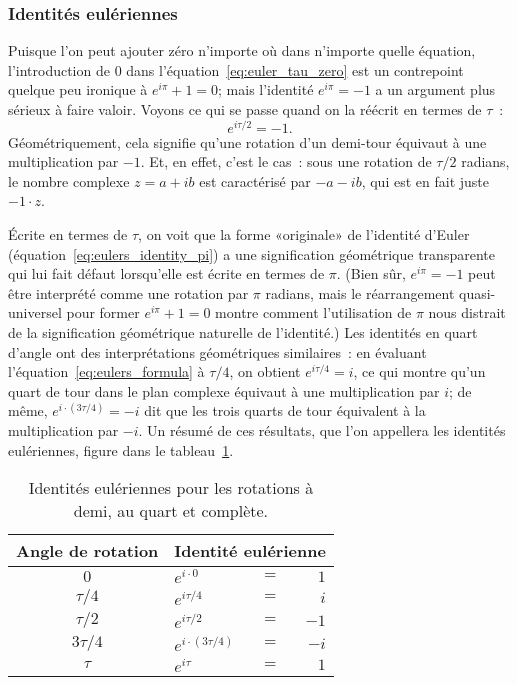       \subsubsection{Identités eulériennes} %
      \label{sec:eulerian_identities}

Puisque l'on peut ajouter zéro n'importe où dans n'importe quelle équation,
l'introduction de $0$ dans l'équation~\eqref{eq:euler_tau_zero} est un
contrepoint quelque peu ironique à $e^{i\pi} + 1 = 0$\ns; mais l'identité
$e^{i\pi} = -1$ a un argument plus sérieux à faire valoir. Voyons ce qui
se passe quand on la réécrit en termes de $\tau$~:
\[
e^{i\tau /2} = -1.
\]
Géométriquement, cela signifie qu'une rotation d'un demi-tour équivaut à une
multiplication par $-1$. Et, en effet, c'est le cas~: sous une rotation de
$\tau/2$ radians, le nombre complexe $z = a + ib$ est caractérisé par $-a - ib$, qui
est en fait juste $-1\cdot z$.

Écrite en termes de $\tau$, on voit que la forme «\ns originale\ns » de l'identité
d'Euler (équation~\eqref{eq:eulers_identity_pi}) a une signification
géométrique transparente qui lui fait défaut lorsqu'elle est écrite en termes de
$\pi$. (Bien sûr, $e^{i\pi} = -1$ peut être interprété comme une rotation par
$\pi$ radians, mais le réarrangement quasi-universel pour former $e^{i\pi} + 1 =
0$ montre comment l'utilisation de $\pi$ nous distrait de la signification
géométrique naturelle de l'identité.) Les identités en quart d'angle ont des
interprétations géométriques similaires~: en évaluant
l'équation~\eqref{eq:eulers_formula} à $\tau/4$, on obtient $e^{i\tau/4} = i$,
ce qui montre qu'un quart de tour dans le plan complexe équivaut à une multiplication
par $i$\ns; de même, $e^{i\cdot(3\tau/4)} = -i$ dit que les trois quarts de tour
équivalent à la multiplication par $-i$. Un résumé de ces résultats, que l'on
appellera les identités eulériennes, figure dans le
tableau~\ref{table:eulerian_identities}.

\begin{table}
\begin{center}
\begin{tabular}{cllr}
Angle de rotation & \multicolumn{3}{c}{Identité eulérienne} \\ \hline
$0$ & $e^{i\cdot0}$ & $ = $ & $1$ \smallskip \\
$\tau/4$ & $e^{i\tau/4}$ & $ = $ & $i$ \smallskip \\
$\tau/2$ & $e^{i\tau/2}$ & $ = $ & $-1$ \smallskip \\
$3\tau/4$ & $e^{i\cdot(3\tau/4)}$ & $ = $ & $-i$ \smallskip \\
$\tau$ & $e^{i\tau}$ & $ = $ & $1$
\end{tabular}
\end{center}
\caption{Identités eulériennes pour les rotations à demi, au quart et
complète.\label{table:eulerian_identities}}
\end{table}

